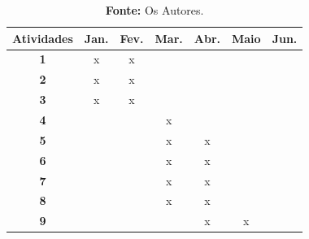 \begin{table}[h!]
\centering
\caption{Cronograma de atividades realizado}
\label{tab:cronograma2}
\begin{tabular}{|c|c|c|c|c|c|c|}
\hline
\textbf{Atividades} & \textbf{Jan.} & \textbf{Fev.} & \textbf{Mar.} & \textbf{Abr.} & \textbf{Maio} & \textbf{Jun.}\\ 
\hline
\textbf{1}         &     x     &      x     &        &          &           &    \\          
\hline
\textbf{2}         &      x    &       x    &        &          &           &    \\          
\hline
\textbf{3}         &      x    &      x     &        &          &           &    \\          
\hline
\textbf{4}         &          &           &    x    &          &           &    \\          
\hline
\textbf{5}         &          &           &    x    &     x     &           &    \\          
\hline
\textbf{6}         &          &           &    x    &    x      &           &    \\          
\hline
\textbf{7}         &          &           &    x    &     x     &           &    \\          
\hline
\textbf{8}         &          &           &    x   &      x    &           &    \\          
\hline
\textbf{9}         &          &           &        &     x    &     x     &    \\          
\hline
\end{tabular}
    \caption*{\small \textbf{Fonte:} Os Autores.}

\end{table}
